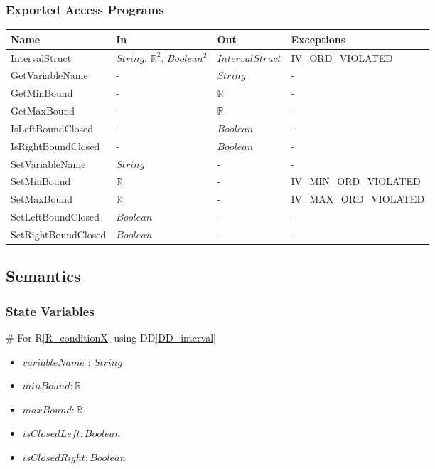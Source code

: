 \documentclass[12pt, titlepage]{article}
\newcommand{\rref}[1]{R\ref{#1}}
\newcommand{\ddref}[1]{DD\ref{#1}}
\begin{document}
\subsubsection{Exported Access Programs}

\begin{center}
	\begin{tabular}{p{3.8cm} p{2.5cm} p{3cm} p{5cm}}
		\hline
		\textbf{Name} & \textbf{In} & \textbf{Out} & \textbf{Exceptions} \\
		\hline		
		IntervalStruct & $String$, $\mathbb{R}^2$, $Boolean^2$ & 
		$IntervalStruct$ & 
		IV\_ORD\_VIOLATED \\
		GetVariableName & - & $String$ & - \\
		GetMinBound & - & $\mathbb{R}$ & - \\
		GetMaxBound & - & $\mathbb{R}$ & - \\
		IsLeftBoundClosed & - & $Boolean$ & - \\
		IsRightBoundClosed & - & $Boolean$ & - \\
		SetVariableName & $String$ & - & - \\
		SetMinBound & $\mathbb{R}$ & - & IV\_MIN\_ORD\_VIOLATED \\
		SetMaxBound & $\mathbb{R}$ & - & IV\_MAX\_ORD\_VIOLATED \\
		SetLeftBoundClosed & $Boolean$ & - & - \\
		SetRightBoundClosed & $Boolean$ & - & - \\
		\hline
	\end{tabular}
\end{center}

\subsection{Semantics}

\subsubsection{State Variables}

\# For \rref{R_conditionX} using \ddref{DD_interval}
\begin{itemize}
	\item $variableName$ : $String$
	\item $minBound : \mathbb{R}$
	\item $maxBound : \mathbb{R}$
	\item $isClosedLeft : Boolean$
	\item $isClosedRight : Boolean$
\end{itemize}
\end{document}
